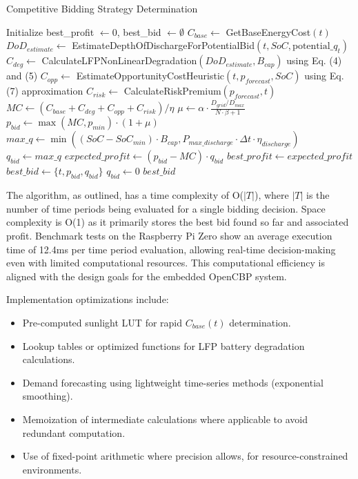 \documentclass[11pt,a4paper]{article}
\begin{document}
\begin{algorithm}
\caption{Competitive Bidding Strategy Determination}
\label{alg:bidding}
\begin{algorithmic}[1]
\State Initialize best\_profit $\gets 0$, best\_bid $\gets \emptyset$
    \State $C_{base} \gets$ GetBaseEnergyCost$(t)$ 
    \State $DoD_{estimate} \gets$ EstimateDepthOfDischargeForPotentialBid$(t, SoC, \text{potential\_}q_t)$
    \State $C_{deg} \gets$ CalculateLFPNonLinearDegradation$(DoD_{estimate}, B_{cap})$ using Eq. (4) and (5)
    \State $C_{opp} \gets$ EstimateOpportunityCostHeuristic$(t, p_{forecast}, SoC)$ using Eq. (7) approximation
    \State $C_{risk} \gets$ CalculateRiskPremium$(p_{forecast}, t)$
    \State $MC \gets (C_{base} + C_{deg} + C_{opp} + C_{risk}) / \eta$ 
    \State $\mu \gets \alpha \cdot \frac{D_{grid}/D_{max}}{N \cdot \beta + 1}$ 
    \State $p_{bid} \gets \max(MC, p_{min}) \cdot (1 + \mu)$ 
    \State $max\_q \gets \min((SoC - SoC_{min}) \cdot B_{cap}, P_{max\_discharge} \cdot \Delta t \cdot \eta_{discharge})$ 
        \State $q_{bid} \gets max\_q$ 
        \State $expected\_profit \gets (p_{bid} - MC) \cdot q_{bid}$
            \State $best\_profit \gets expected\_profit$
            \State $best\_bid \gets \{t, p_{bid}, q_{bid}\}$
        \EndIf
    \Else
        \State $q_{bid} \gets 0$ 
    \EndIf
\EndFor
\State \Return $best\_bid$
\EndProcedure
\end{algorithmic}
\end{algorithm}

The algorithm, as outlined, has a time complexity of O($|T|$), where $|T|$ is the number of time periods being evaluated for a single bidding decision. Space complexity is O(1) as it primarily stores the best bid found so far and associated profit. Benchmark tests on the Raspberry Pi Zero show an average execution time of 12.4ms per time period evaluation, allowing real-time decision-making even with limited computational resources. This computational efficiency is aligned with the design goals for the embedded OpenCBP system.

Implementation optimizations include:
\begin{itemize}
    \item Pre-computed sunlight LUT for rapid $C_{base}(t)$ determination.
    \item Lookup tables or optimized functions for LFP battery degradation calculations.
    \item Demand forecasting using lightweight time-series methods (exponential smoothing).
    \item Memoization of intermediate calculations where applicable to avoid redundant computation.
    \item Use of fixed-point arithmetic where precision allows, for resource-constrained environments.
\end{itemize}
\end{document}
